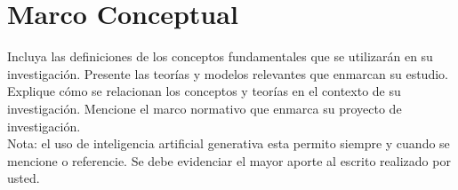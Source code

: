 \chapter{Marco Conceptual}



Incluya las definiciones de los conceptos fundamentales que se utilizarán en su investigación.
Presente las teorías y modelos relevantes que enmarcan su estudio.
Explique cómo se relacionan los conceptos y teorías en el contexto de su investigación.
Mencione el marco normativo que enmarca su proyecto de investigación. \\[1cm]
Nota: el uso de inteligencia artificial generativa esta permito siempre y cuando se mencione o referencie. Se debe evidenciar el mayor aporte al escrito realizado por usted.
